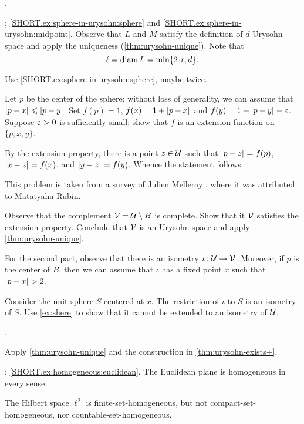  \cite[$\text{(d)}$ on page 82]{gromov-2007}.

\parbf{\ref{ex:sphere-in-urysohn}}; \ref{SHORT.ex:sphere-in-urysohn:sphere} and \ref{SHORT.ex:sphere-in-urysohn:midpoint}.
Observe that $L$ and $M$ satisfy the definition of $d$-Urysohn space and apply the uniqueness (\ref{thm:urysohn-unique}).
Note that
\[\ell=\diam L=\min\{2\cdot r, d\}.\]

Use \ref{SHORT.ex:sphere-in-urysohn:sphere}, maybe twice.

Let $p$ be the center of the sphere;
without loss of generality, we can assume that $\dist{p}{x}{}\le \dist{p}{y}{}$.
Set $f(p)=1$, $f(x)=1+\dist{p}{x}{}$ and $f(y)=1+\dist{p}{y}{}-\eps$.
Suppose $\varepsilon>0$ is sufficiently small;
show that $f$ is an extension function on $\{p,x,y\}$.

By the extension property, there is a point $z\in \mathcal{U}$ such that $\dist{p}{z}{}=f(p)$, $\dist{x}{z}{}=f(x)$, and $\dist{y}{z}{}=f(y)$.
Whence the statement follows.

 This problem is taken from a survey of Julien Melleray
 \cite[Prop. 4.3]{melleray}, where it was attributed to Matatyahu Rubin.

Observe that the complement $\mathcal{V}=\mathcal{U}\setminus B$ is complete.
Show that it $\mathcal{V}$ satisfies the extension property.
Conclude that $\mathcal{V}$ is an Urysohn space and apply \ref{thm:urysohn-unique}.

For the second part, observe that there is an isometry $\iota\colon\mathcal{U}\to \mathcal{V}$.
Moreover, if $p$ is the center of $B$, then we can assume that $\iota$ has a fixed point $x$ such that $\dist{p}{x}{}>2$.

Consider the unit sphere $S$ centered at $x$.
The restriction of $\iota$ to $S$ is an isometry of $S$.
Use \ref{ex:shere} to show that it cannot be extended to an isometry of $\mathcal{U}$.

 \cite[Sec. 4.4]{melleray}.

Apply \ref{thm:urysohn-unique} and the construction in \ref{thm:urysohn-exists+}.

\parbf{\ref{ex:homogeneous}}; \ref{SHORT.ex:homogeneous:euclidean}.
The Euclidean plane is homogeneous in every sense.

The Hilbert space $\ell^2$ is finite-set-homogeneous, but not compact-set-homogeneous, nor countable-set-homogeneous.

